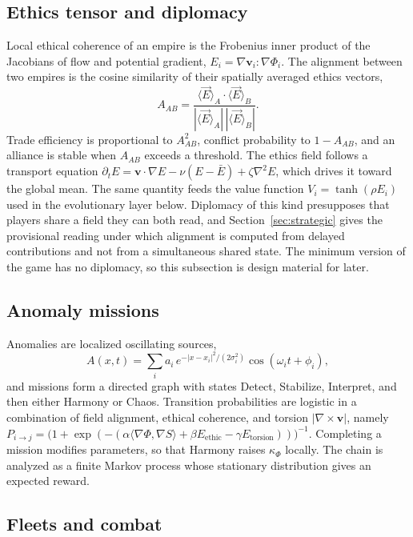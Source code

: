 \documentclass[11pt]{article}
\begin{document}
\subsection{Ethics tensor and diplomacy}

Local ethical coherence of an empire is the Frobenius inner product of the Jacobians of flow and potential gradient, $E_i=\nabla\mathbf{v}_i:\nabla\Phi_i$. The alignment between two empires is the cosine similarity of their spatially averaged ethics vectors,
\[
A_{AB}=\frac{\langle \vec E\rangle_A\cdot\langle \vec E\rangle_B}{|\langle \vec E\rangle_A|\,|\langle \vec E\rangle_B|}.
\]
Trade efficiency is proportional to $A_{AB}^2$, conflict probability to $1-A_{AB}$, and an alliance is stable when $A_{AB}$ exceeds a threshold. The ethics field follows a transport equation $\partial_t E=\mathbf{v}\cdot\nabla E-\nu(E-\bar E)+\zeta\nabla^2E$, which drives it toward the global mean. The same quantity feeds the value function $V_i=\tanh(\rho E_i)$ used in the evolutionary layer below. Diplomacy of this kind presupposes that players share a field they can both read, and Section~\ref{sec:strategic} gives the provisional reading under which alignment is computed from delayed contributions and not from a simultaneous shared state. The minimum version of the game has no diplomacy, so this subsection is design material for later.

\subsection{Anomaly missions}

Anomalies are localized oscillating sources,
\[
A(x,t)=\sum_i a_i\, e^{-|x-x_i|^2/(2\sigma_i^2)}\cos(\omega_i t+\phi_i),
\]
and missions form a directed graph with states Detect, Stabilize, Interpret, and then either Harmony or Chaos. Transition probabilities are logistic in a combination of field alignment, ethical coherence, and torsion $|\nabla\times\mathbf{v}|$, namely $P_{i\to j}=\big(1+\exp(-(\alpha\langle\nabla\Phi,\nabla S\rangle+\beta E_{\text{ethic}}-\gamma E_{\text{torsion}}))\big)^{-1}$. Completing a mission modifies parameters, so that Harmony raises $\kappa_\Phi$ locally. The chain is analyzed as a finite Markov process whose stationary distribution gives an expected reward.

\subsection{Fleets and combat}
\end{document}
